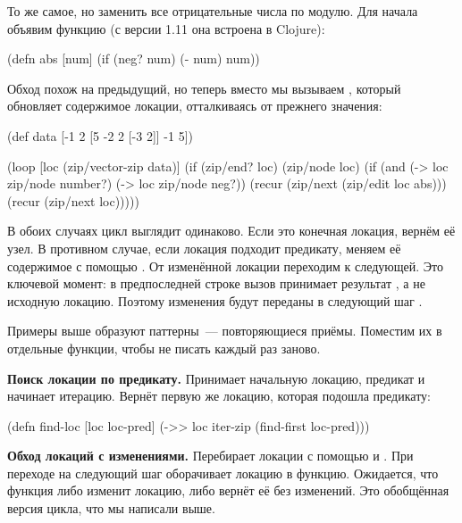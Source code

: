 То же самое, но заменить все отрицательные числа по модулю. Для начала объявим
функцию  (с версии 1.11 она встроена в Clojure):

\begin{english}
  \begin{clojure}
(defn abs
  [num]
  (if (neg? num)
    (- num)
    num))
  \end{clojure}
\end{english}

Обход похож на предыдущий, но теперь вместо  мы вызываем
, который обновляет содержимое локации, отталкиваясь от прежнего
значения:

\begin{english}
  \begin{clojure}
(def data
  [-1 2 [5 -2 2 [-3 2]] -1 5])

(loop [loc (zip/vector-zip data)]
  (if (zip/end? loc)
    (zip/node loc)
    (if (and (-> loc zip/node number?)
             (-> loc zip/node neg?))
      (recur (zip/next (zip/edit loc abs)))
      (recur (zip/next loc)))))
  \end{clojure}
\end{english}

В обоих случаях цикл выглядит одинаково. Если это конечная локация, вернём её
узел. В противном случае, если локация подходит предикату, меняем её содержимое
с помощью . От изменённой локации переходим к следующей. Это ключевой
момент: в предпоследней строке вызов  принимает результат ,
а не исходную локацию. Поэтому изменения будут переданы в следующий шаг .

Примеры выше образуют паттерны~--- повторяющиеся приёмы. Поместим их в отдельные
функции, чтобы не писать каждый раз заново.


\textbf{Поиск локации по предикату.} Принимает начальную локацию, предикат и
начинает итерацию. Вернёт первую же локацию, которая подошла предикату:

\begin{english}
  \begin{clojure}
(defn find-loc [loc loc-pred]
  (->> loc
       iter-zip
       (find-first loc-pred)))
  \end{clojure}
\end{english}

\textbf{Обход локаций с изменениями.} Перебирает локации с помощью  и
. При переходе на следующий шаг оборачивает локацию в
функцию. Ожидается, что функция либо изменит локацию, либо вернёт её без
изменений. Это обобщённая версия цикла, что мы написали выше.

